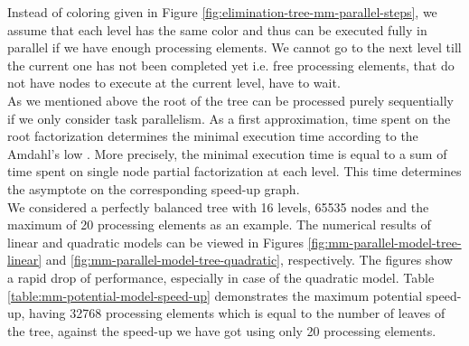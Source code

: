 Instead of coloring given in Figure \ref{fig:elimination-tree-mm-parallel-steps}, we assume that each level has the same color and thus can be executed fully in parallel if we have enough processing elements. We cannot go to the next level till the current one has not been completed yet i.e. free processing elements, that do not have nodes to execute at the current level, have to wait.\\


As we mentioned above the root of the tree can be processed purely sequentially if we only consider task parallelism. As a first approximation, time spent on the root factorization determines the minimal execution time according to the Amdahl's low \cite{wiki:amdahls-low}. More precisely, the minimal execution time is equal to a sum of time spent on single node partial factorization at each level. This time determines the asymptote on the corresponding speed-up graph.\\


We considered a perfectly balanced tree with 16 levels, 65535 nodes and the maximum of 20 processing elements as an example. The numerical results of linear and quadratic models can be viewed in Figures \ref{fig:mm-parallel-model-tree-linear} and \ref{fig:mm-parallel-model-tree-quadratic}, respectively. The figures show a rapid drop of performance, especially in case of the quadratic model. Table \ref{table:mm-potential-model-speed-up} demonstrates the maximum potential speed-up, having 32768 processing elements which is equal to the number of leaves of the tree, against the speed-up we have got using only 20 processing elements.\\


